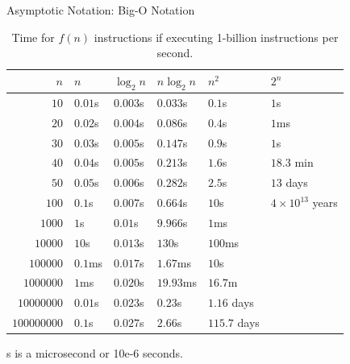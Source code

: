\documentclass[14pt,aspectratio=1610]{beamer}
\begin{document}
\begin{frame}{Asymptotic Notation: Big-O Notation}
\center\vspace{-0.5em}%
\begin{table}[]
\caption{Time for \(f(n)\) instructions if executing 1-billion instructions per second.}\vspace{-0.75em}
{\small%
\begin{tabular}{rlllll}
  \toprule%
\(n\) & \(n\) & \(\log_2{n}\) & \(n \log_2{n}\) & \(n^2\) & \(2^n\) \\
\midrule
\(10\)         & \(0.01\)\textmu{}s        & \(0.003\)\textmu{}s           & \(0.033\)\textmu{}s             & \(0.1\)\textmu{}s          & \(1\)\textmu{}s            \\
\(20\)         & \(0.02\)\textmu{}s        & \(0.004\)\textmu{}s           & \(0.086\)\textmu{}s             & \(0.4\)\textmu{}s          & \(1\)ms                \\
\(30\)         & \(0.03\)\textmu{}s        & \(0.005\)\textmu{}s           & \(0.147\)\textmu{}s             & \(0.9\)\textmu{}s          & \(1\)s                 \\
\(40\)         & \(0.04\)\textmu{}s        & \(0.005\)\textmu{}s           & \(0.213\)\textmu{}s             & \(1.6\)\textmu{}s          & \(18.3\) min           \\
\(50\)         & \(0.05\)\textmu{}s        & \(0.006\)\textmu{}s           & \(0.282\)\textmu{}s             & \(2.5\)\textmu{}s          & \(13\) days            \\
\(100\)        & \(0.1\)\textmu{}s         & \(0.007\)\textmu{}s           & \(0.664\)\textmu{}s             & \(10\)\textmu{}s           & \(4\times10^{13}\) years       \\
\(1000\)       & \(1\)\textmu{}s           & \(0.01\)\textmu{}s            & \(9.966\)\textmu{}s             & \(1\)ms                &                    \\
\(10000\)      & \(10\)\textmu{}s          & \(0.013\)\textmu{}s           & \(130\)\textmu{}s               & \(100\)ms              &                    \\
\(100000\)     & \(0.1\)ms             & \(0.017\)\textmu{}s           & \(1.67\)ms                  & \(10\)s                &                    \\
\(1000000\)    & \(1\)ms               & \(0.020\)\textmu{}s           & \(19.93\)ms                 & \(16.7\)m              &                    \\
\(10000000\)   & \(0.01\)s             & \(0.023\)\textmu{}s           & \(0.23\)s                   & \(1.16\) days          &                    \\
\(100000000\)  & \(0.1\)s              & \(0.027\)\textmu{}s           & \(2.66\)s                   & \(115.7\) days\\
\bottomrule%
\end{tabular}}
\end{table}\vspace{-0.5em}
{\footnotesize *\textmu{}s is a microsecond or 10e-6 seconds.}
\end{frame}
\end{document}
